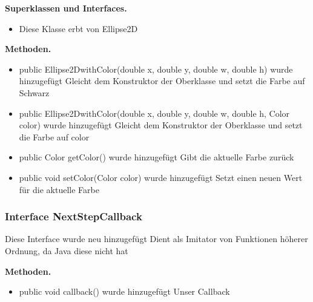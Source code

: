 \documentclass{article}
\begin{document}
	    \textbf{Superklassen und Interfaces.}\newline
	   \begin{itemize}
            \item Diese Klasse erbt von Ellipse2D\newline
           \end{itemize}

    \textbf{Methoden.}\newline
	   \begin{itemize}
           \item public Ellipse2DwithColor(double x, double y, double w, double h) wurde hinzugefügt\newline
               Gleicht dem Konstruktor der Oberklasse und setzt die Farbe auf Schwarz\newline
           \item public Ellipse2DwithColor(double x, double y, double w, double h, Color color) wurde hinzugefügt\newline
               Gleicht dem Konstruktor der Oberklasse und setzt die Farbe auf color\newline
           \item public Color getColor() wurde hinzugefügt\newline
               Gibt die aktuelle Farbe zurück\newline
           \item public void setColor(Color color) wurde hinzugefügt\newline
               Setzt einen neuen Wert für die aktuelle Farbe\newline
           \end{itemize}

	\subsubsection{Interface NextStepCallback}
    Diese Interface wurde neu hinzugefügt\newline
    Dient als Imitator von Funktionen höherer Ordnung,\newline
    da Java diese nicht hat\newline

    \textbf{Methoden.}\newline
	   \begin{itemize}
           \item public void callback() wurde hinzugefügt\newline
               Unser Callback\newline
           \end{itemize}
\end{document}
